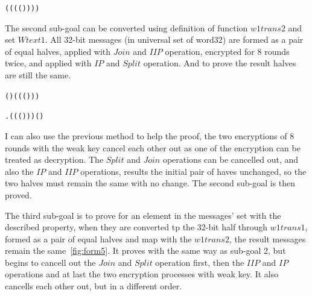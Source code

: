 \documentclass{article}
\begin{document}
\begin{alltt}
   \HOLTokenTurnstile{}   \HOLSymConst{=}  ( ( (  (  ) )))
\end{alltt}

The second sub-goal can be converted using definition of function $w1trans2$ and set $Wtext1$. All 32-bit messages
(in universal set of word32) are formed as a pair of equal halves, applied with $Join$ and $IIP$ operation, encrypted
for 8 rounds twice, and applied with $IP$ and $Split$ operation. And to prove the result halves are still the same.

\begin{alltt}
   \HOLTokenTurnstile{}   \HOLSymConst{=}   (  ) ( ( (\HOLSymConst{,})))
\end{alltt}

\begin{alltt}
   \HOLTokenTurnstile{}  \HOLSymConst{=}
   \HOLTokenLeftbrace{} \HOLTokenBar{} \HOLSymConst{\HOLTokenExists{}}.  ( (  (  ) )) \HOLSymConst{=} (\HOLSymConst{,})\HOLTokenRightbrace{}
\end{alltt}

I can also use the previous method to help the proof, the two encryptions of 8 rounds with the weak key cancel each other out
as one of the encryption can be treated as decryption. The $Split$ and $Join$ operations can be cancelled out, and also the
$IP$ and $IIP$ operations, results the initial pair of haves unchanged, so the two halves must remain the same with no change.
The second sub-goal is then proved.

The third sub-goal is to prove for an element in the messages' set with the described property, when they are converted
tp the 32-bit half through $w1trans1$, formed as a pair of equal halves and map with the $w1trans2$, the result messages
remain the same~\ref{fig:form5}. It proves with the same way as sub-goal 2, but begins to cancell out the $Join$ and $Split$ operation first, then
the $IIP$ and $IP$ operations and at last the two encryption processes with weak key. It also cancells each other out,
but in a different order.
\end{document}
